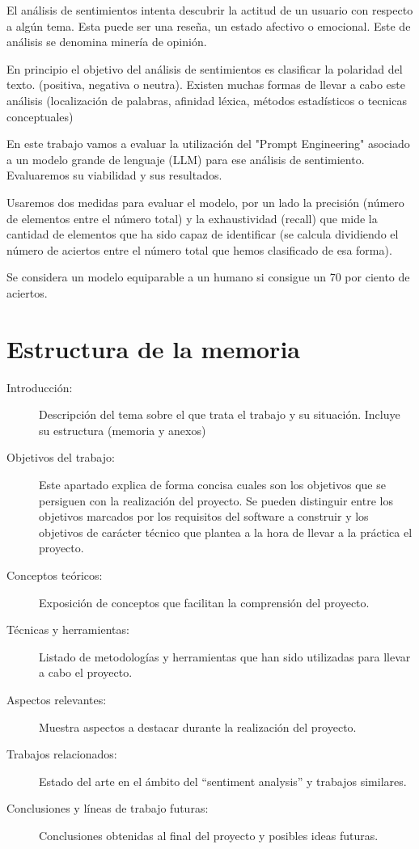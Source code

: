 
El análisis de sentimientos intenta descubrir la actitud de un usuario 
con respecto a algún tema.
Esta puede ser una reseña, un estado afectivo o emocional. 
Este de análisis se denomina minería de opinión.

En principio el objetivo del análisis de sentimientos es 
clasificar la polaridad del texto. (positiva, negativa o neutra).
Existen muchas formas de llevar a cabo este análisis (localización de palabras, 
afinidad léxica, métodos estadísticos o tecnicas conceptuales)

En este trabajo vamos a evaluar la utilización del "Prompt Engineering" 
asociado a un modelo grande de lenguaje (LLM) para ese análisis de sentimiento.
Evaluaremos su viabilidad y sus resultados. 

Usaremos dos medidas para evaluar el modelo, 
por un lado la precisión (número de elementos entre el número total) 
y la exhaustividad (recall) que mide la cantidad de elementos 
que ha sido capaz de identificar 
(se calcula dividiendo el número de aciertos entre el número 
total que hemos clasificado de esa forma). 

Se considera un modelo equiparable a un humano si consigue un 70 por ciento de aciertos.

\section{Estructura de la memoria}
\begin{description}
	\item[Introducción:] Descripción del tema sobre el que trata el trabajo y su situación. 
    Incluye su estructura (memoria y anexos)
	\item[Objetivos del trabajo:] Este apartado explica de forma concisa cuales son los objetivos 
    que se persiguen con la realización del proyecto. 
    Se pueden distinguir entre los objetivos marcados por los requisitos del software a construir y
     los objetivos de carácter técnico que plantea a la hora de llevar a la práctica el proyecto.
    \item[Conceptos teóricos:] Exposición de conceptos que facilitan la comprensión del proyecto.
    \item[Técnicas y herramientas:] Listado de metodologías y herramientas que han sido 
    utilizadas para llevar a cabo el proyecto.
    \item[Aspectos relevantes:] Muestra aspectos a destacar durante la realización del proyecto.
    \item[Trabajos relacionados:] Estado del arte en el ámbito del ``sentiment analysis'' y trabajos similares.
    \item[Conclusiones y líneas de trabajo futuras:] Conclusiones obtenidas al final del proyecto y posibles ideas futuras.
\end{description}
